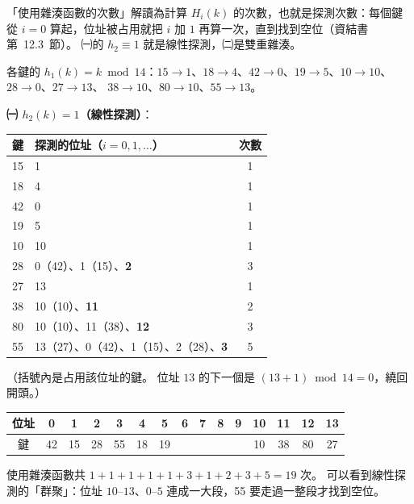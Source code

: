 \begin{pastsoln}
「使用雜湊函數的次數」解讀為計算 $H_i(k)$ 的次數，也就是探測次數：每個鍵從 $i = 0$ 算起，位址被占用就把 $i$ 加 $1$
再算一次，直到找到空位（資結書第~12.3~節）。 ㈠的 $h_2 \equiv 1$ 就是線性探測，㈡是雙重雜湊。

各鍵的 $h_1(k) = k \bmod 14$：$15 \to 1$、$18 \to 4$、$42 \to 0$、$19 \to 5$、$10 \to 10$、$28 \to 0$、$27 \to 13$、
$38 \to 10$、$80 \to 10$、$55 \to 13$。

\textbf{㈠ $h_2(k) = 1$（線性探測）}：
\begin{center}
\small
\begin{tabular}{clc}
\toprule
鍵 & 探測的位址（$i = 0, 1, \ldots$） & 次數 \\
\midrule
15 & 1 & 1 \\
18 & 4 & 1 \\
42 & 0 & 1 \\
19 & 5 & 1 \\
10 & 10 & 1 \\
28 & 0（42）、1（15）、\textbf{2} & 3 \\
27 & 13 & 1 \\
38 & 10（10）、\textbf{11} & 2 \\
80 & 10（10）、11（38）、\textbf{12} & 3 \\
55 & 13（27）、0（42）、1（15）、2（28）、\textbf{3} & 5 \\
\bottomrule
\end{tabular}
\end{center}
（括號內是占用該位址的鍵。 位址 $13$ 的下一個是 $(13 + 1) \bmod 14 = 0$，繞回開頭。）
\begin{center}
\small
\setlength{\tabcolsep}{4pt}
\begin{tabular}{c|cccccccccccccc}
位址 & 0 & 1 & 2 & 3 & 4 & 5 & 6 & 7 & 8 & 9 & 10 & 11 & 12 & 13 \\
\hline
鍵 & 42 & 15 & 28 & 55 & 18 & 19 & & & & & 10 & 38 & 80 & 27 \\
\end{tabular}
\end{center}
使用雜湊函數共 $1 + 1 + 1 + 1 + 1 + 3 + 1 + 2 + 3 + 5 = 19$ 次。 可以看到線性探測的「群聚」：位址 $10$--$13$、$0$--$5$
連成一大段，55 要走過一整段才找到空位。


\end{pastsoln}
